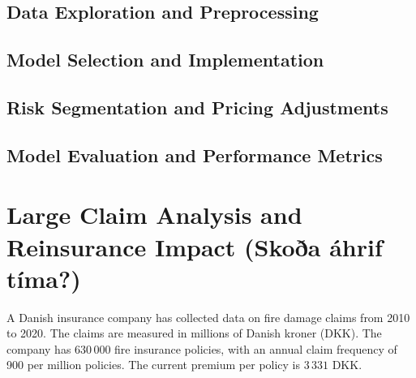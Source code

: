 \documentclass[8pt]{article}
\begin{document}
\subsection{Data Exploration and Preprocessing}

\subsection{Model Selection and Implementation}

\subsection{Risk Segmentation and Pricing Adjustments}


\subsection{Model Evaluation and Performance Metrics}

\newpage

\section{Large Claim Analysis and Reinsurance Impact (Skoða áhrif tíma?)}
\label{sec:partB}


A Danish insurance company has collected data on fire damage claims from 2010 to 2020. The claims are measured in millions of Danish kroner (DKK). The company has $630\,000$ fire insurance policies, with an annual claim frequency of 900 per million policies. The current premium per policy is $3\,331$ DKK.
\end{document}
